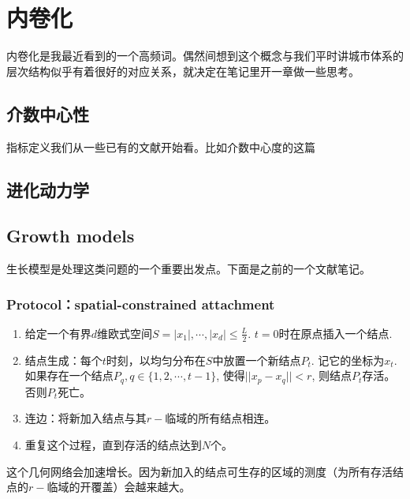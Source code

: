 \chapter{内卷化}

内卷化是我最近看到的一个高频词。偶然间想到这个概念与我们平时讲城市体系的层次结构似乎有着很好的对应关系，就决定在笔记里开一章做一些思考。

\section{介数中心性}

指标定义我们从一些已有的文献开始看。比如介数中心度的这篇~\cite{Barthelemy2018BC}

\section{进化动力学}

\section{Growth models}

生长模型是处理这类问题的一个重要出发点。下面是之前的一个文献笔记。

\subsection{Protocol：spatial-constrained attachment}
\begin{enumerate}
\item
  给定一个有界\(d\)维欧式空间\(S=|x_1|,\cdots,|x_d|\le\frac{L}{2}.\)
  \(t=0\)时在原点插入一个结点.
\item
  结点生成：每个\(t\)时刻，以均匀分布在\(S\)中放置一个新结点\(P_t\).
  记它的坐标为\(x_t.\) 如果存在一个结点\(P_q,q\in\{1,2,\cdots,t-1\}\),
  使得\(||x_p-x_q||< r\), 则结点\(P_t\)存活。否则\(P_t\)死亡。
\item
  连边：将新加入结点与其\(r-\)临域的所有结点相连。
\item
  重复这个过程，直到存活的结点达到\(N\)个。
\end{enumerate}

这个几何网络会加速增长。因为新加入的结点可生存的区域的测度（为所有存活结点的\(r-\)临域的开覆盖）会越来越大。

